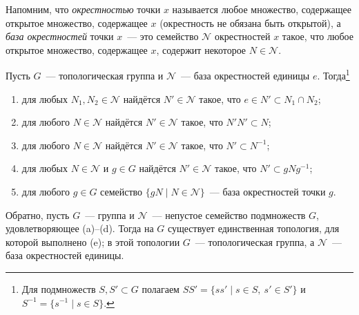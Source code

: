 Напомним, что \emph{окрестностью} точки $x$ называется любое множество, содержащее открытое множество, содержащее $x$
(окрестность не обязана быть открытой), а \emph{база окрестностей} точки $x$~--- это семейство $\mathcal N$ окрестностей
$x$ такое, что любое открытое
множество, содержащее $x$, содержит некоторое $N\in\mathcal N$.

\begin{proposition}[7.2]
Пусть $G$~--- топологическая группа и $\mathcal N$~--- база окрестностей единицы $e$. Тогда\footnote{Для подмножеств
$S,S'\subset G$ полагаем $SS'=\{ss'\mid s\in S,\ s'\in S'\}$ и $S^{-1}=\{s^{-1}\mid s\in S\}$.}
\begin{enumerate}[label=\textup{(\alph*)}]
\item для любых $N_1,N_2\in\mathcal N$ найдётся $N'\in\mathcal N$ такое, что $e\in N'\subset N_1\cap N_2$;
\item для любого $N\in\mathcal N$ найдётся $N'\in\mathcal N$ такое, что $N'N'\subset N$;
\item для любого $N\in\mathcal N$ найдётся $N'\in\mathcal N$ такое, что $N'\subset N^{-1}$;
\item для любых $N\in\mathcal N$ и $g\in G$ найдётся $N'\in\mathcal N$ такое, что $N'\subset gNg^{-1}$;
\item для любого $g\in G$ семейство $\{gN\mid N\in\mathcal N\}$~--- база окрестностей точки $g$.
\end{enumerate}
Обратно, пусть $G$~--- группа и $\mathcal N$~--- непустое семейство подмножеств $G$, удовлетворяющее (a)--(d). Тогда на
$G$ существует единственная топология, для которой выполнено (e); в этой топологии $G$~--- топологическая группа, а
$\mathcal N$~--- база окрестностей единицы.
\end{proposition}

